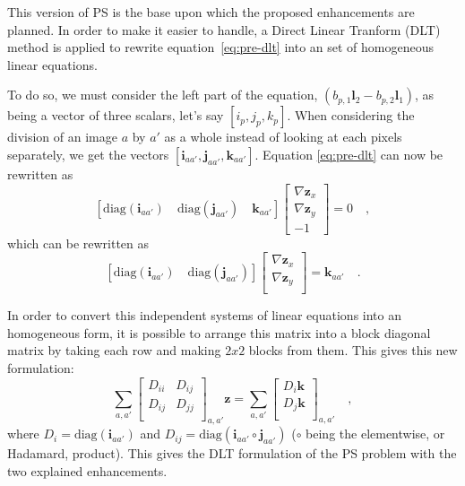 This version of PS is the base upon which the proposed enhancements are planned. In order to make it easier to handle, a Direct Linear Tranform (DLT) method is applied to rewrite equation~\eqref{eq:pre-dlt} into an set of homogeneous linear equations.


To do so, we must consider the left part of the equation, $\left( b_{p,1} \mathbf{l}_2 - b_{p,2} \mathbf{l}_1 \right)$, as being a vector of three scalars, let's say $\left[ i_p, j_p, k_p \right]$. When considering the division of an image $a$ by $a'$ as a whole instead of looking at each pixels separately, we get the vectors $\left[ \mathbf{i}_{aa'}, \mathbf{j}_{aa'}, \mathbf{k}_{aa'} \right]$. Equation \eqref{eq:pre-dlt} can now be rewritten as
\begin{equation}
\left[ \mathrm{diag}(\mathbf{i}_{aa'}) \quad \mathrm{diag}(\mathbf{j}_{aa'}) \quad \mathbf{k}_{aa'}\right]
\begin{bmatrix}
\nabla \mathbf{z}_{x} \\
\nabla \mathbf{z}_{y} \\
-1
\end{bmatrix}
= 0 \quad,
\end{equation}
which can be rewritten as
\begin{equation}
\left[ \mathrm{diag}(\mathbf{i}_{aa'}) \quad \mathrm{diag}(\mathbf{j}_{aa'}) \right]
\begin{bmatrix}
\nabla \mathbf{z}_{x} \\
\nabla \mathbf{z}_{y} \\
\end{bmatrix}
= \mathbf{k}_{aa'} \quad.
\end{equation}


In order to convert this independent systems of linear equations into an homogeneous form, it is possible to arrange this matrix into a block diagonal matrix by taking each row and making $2x2$ blocks from them.
This gives this new formulation:
\begin{equation}
\sum_{a,a'}
\begin{bmatrix}
D_{ii} & D_{ij} \\
D_{ij} & D_{jj} \\
\end{bmatrix}_{a,a'}
\mathbf{z} =
\sum_{a,a'}
\begin{bmatrix}
D_i \mathbf{k} \\
D_j \mathbf{k} \\
\end{bmatrix}_{a,a'}
\quad,
\end{equation}
where $D_i = \mathrm{diag}(\mathbf{i}_{aa'})$ and $ D_{ij} = \mathrm{diag}\left(\mathbf{i}_{aa'} \circ \mathbf{j}_{aa'}\right)$ ($\circ$ being the elementwise, or Hadamard, product). This gives the DLT formulation of the PS problem with the two explained enhancements.

